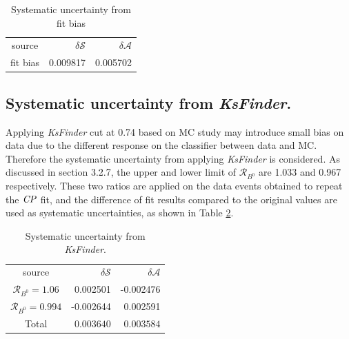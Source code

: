 \begin{table}[htpb]
	\begin{minipage}[b]{1.0\linewidth}
		\centering
		\caption{Systematic uncertainty from fit bias}
		\label{tab:fitbias}
		\begin{tabular}{c r r}
			\hline
			source & $\delta \mathcal{S}$ & $\delta \mathcal{A}$ \\
			fit bias & 0.009817 & 0.005702\\
			\hline
		\end{tabular}
	\end{minipage}
\end{table}


\subsection{Systematic uncertainty from \textit{KsFinder}.}
Applying \textit{KsFinder} cut at 0.74 based on MC study may introduce small bias on data due to the different response on the classifier between data and MC. Therefore the systematic uncertainty from applying \textit{KsFinder} is considered. As discussed in section 3.2.7, the upper and lower limit of  $\mathcal{R}_{B^0}$ are 1.033 and 0.967 respectively. These two ratios are applied on the data events obtained  to repeat the $\it{CP}$ fit, and the difference of fit results compared to the original values are used as systematic uncertainties, as shown in Table \ref{tab:sy_ks}.

\begin{table}[htpb]
	\begin{minipage}[b]{1.0\linewidth}
		\centering
		\caption{Systematic uncertainty from \textit{KsFinder}.}
		\label{tab:sy_ks}
		\begin{tabular}{c r r}
			\hline
			source & $\delta \mathcal{S}$ & $\delta \mathcal{A}$ \\
			$\mathcal{R}_{B^0}=1.06$ & 0.002501
 & -0.002476\\
			$\mathcal{R}_{B^0}=0.994$ & -0.002644
& 0.002591
\\
			\hline
			Total &
			{$0.003640$} &
			{$0.003584$}\\
			\hline
		\end{tabular}
	\end{minipage}
\end{table}

